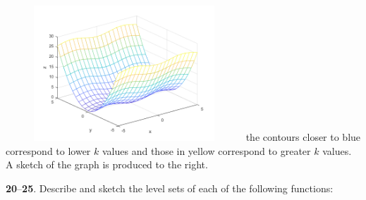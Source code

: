 \documentclass[12pt]{amsbook}
\begin{document}
\begin{enumerate}
  \includegraphics[width=3.5in,height=2.0in]{3_1_19_2.png}
  the contours closer to blue correspond to lower $k$ values and those in yellow correspond to greater $k$ values. A sketch of the graph is produced to the right.
\end{enumerate}

\noindent
{\small {\bf 20}--{\bf 25}}. Describe and sketch the level sets of each of the following functions:
\end{document}

